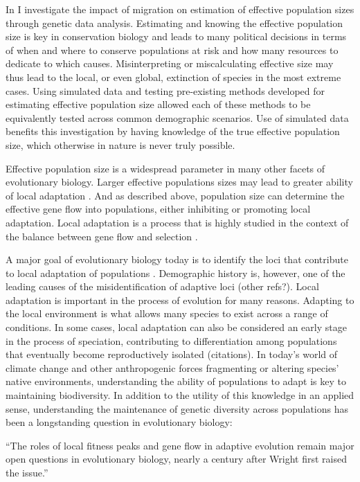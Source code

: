 In  I investigate the impact of migration on estimation of effective population sizes through genetic data analysis. Estimating and knowing the effective population size is key in conservation biology and leads to many political decisions in terms of when and where to conserve populations at risk and how many resources to dedicate to which causes. Misinterpreting or miscalculating effective size may thus lead to the local, or even global, extinction of species in the most extreme cases. Using simulated data and testing pre-existing methods developed for estimating effective population size allowed each of these methods to be equivalently tested across common demographic scenarios. Use of simulated data benefits this investigation by having knowledge of the true effective population size, which otherwise in nature is never truly possible.

Effective population size is a widespread parameter in many other facets of evolutionary biology. Larger effective populations sizes may lead to greater ability of local adaptation \citep{Leimu:2008}. And as described above, population size can determine the effective gene flow into populations, either inhibiting or promoting local adaptation. Local adaptation is a process that is highly studied in the context of the balance between gene flow and selection \citep{Kawecki:2004}.

A major goal of evolutionary biology today is to identify the loci that contribute to local adaptation of populations \citep{Savolainen:2013, Whitlock:2015, LeCorre:2012, Coop:2010}. Demographic history is, however, one of the leading causes of the misidentification of adaptive loci \citep{Whitlock:2015}(\color{red}other refs?\color{black}). Local adaptation is important in the process of evolution for many reasons. Adapting to the local environment is what allows many species to exist across a range of conditions. In some cases, local adaptation can also be considered an early stage in the process of speciation, contributing to differentiation among populations that eventually become reproductively isolated (\color{red}citations\color{black}). In today's world of climate change and other anthropogenic forces fragmenting or altering species' native environments, understanding the ability of populations to adapt is key to maintaining biodiversity. In addition to the utility of this knowledge in an applied sense, understanding the maintenance of genetic diversity across populations has been a longstanding question in evolutionary biology:
\begin{quoteshrink}
  ``The roles of local fitness peaks and gene flow in adaptive evolution remain major open questions in evolutionary biology, nearly a century after Wright first raised the issue.''
  \hfill\citet{Barton:2016}
\end{quoteshrink}


